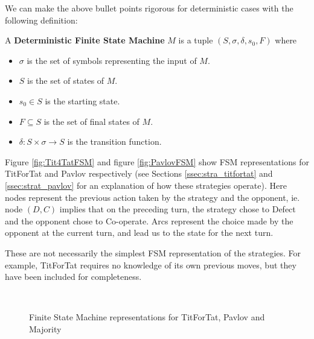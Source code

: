 We can make the above bullet points rigorous for deterministic cases with the following definition:

\begin{definition}\label{def:fsm}
A \textbf{Deterministic Finite State Machine} $M$ is a tuple $(S, \sigma, \delta, s_0, F)$ where
\begin{itemize}
 \item $\sigma$ is the set of symbols representing the input of $M$.
 \item $S$ is the set of states of $M$.
 \item $s_0 \in S$ is the starting state.
 \item $F \subseteq S$ is the set of final states of $M$.
 \item $\delta: S \times \sigma \rightarrow S$ is the transition function.
\end{itemize}
\end{definition}

Figure \ref{fig:Tit4TatFSM} and figure \ref{fig:PavlovFSM} show FSM representations for TitForTat and Pavlov respectively (see Sections \ref{ssec:stra_titfortat} and \ref{ssec:strat_pavlov} for an explanation of how these strategies operate).
Here nodes represent the previous action taken by the strategy and the opponent, ie. node $(D, C)$ implies that on the preceding turn, the strategy chose to Defect and the opponent chose to Co-operate.
Arcs represent the choice made by the opponent at the current turn, and lead us to the state for the next turn.

These are not necessarily the simplest FSM representation of the strategies.
For example, TitForTat requires no knowledge of its own previous moves, but they have been included for completeness.

\begin{figure}[hbtp!]
\centering
{}
\\
\caption{Finite State Machine representations for TitForTat, Pavlov and Majority}
\end{figure}

